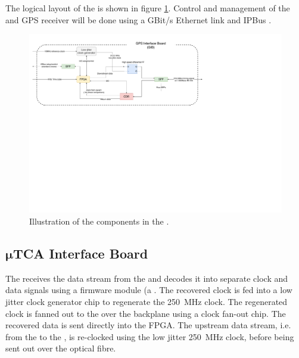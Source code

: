 \documentclass[main.tex]{subfiles}
\begin{document}
The logical layout of the  is shown in figure \ref{fig:gib_layout}. Control and management of the  and GPS receiver will be done using a GBit/s Ethernet link and IPBus \cite{ipbus}.

\begin{figure}[h]
\includegraphics[width=\textwidth]{gib_block_diagram.pdf}
\caption{Illustration of the components in the .}
\label{fig:gib_layout}
\end{figure}

\subsection[$\mu$TCA Interface Board]{$\boldsymbol{\mu}$TCA Interface Board}
The  receives the  data stream from the  and decodes it into separate clock and data signals using a firmware  module (a  . The recovered clock is fed into a low jitter clock generator chip to regenerate the \SI{250}{\MHz} clock. The regenerated clock is fanned out to the  over the  backplane using a clock fan-out chip. The recovered data is sent directly into the  FPGA. The upstream data stream, i.e. from the  to the , is re-clocked using the low jitter \SI{250}{\MHz} clock, before being sent out over the optical fibre.
\end{document}
